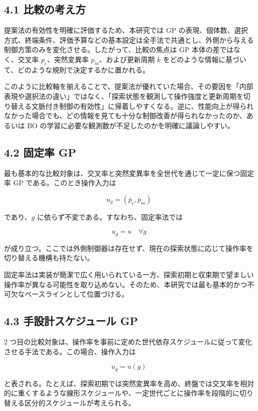 \subsection{4.1 比較の考え方}


提案法の有効性を明確に評価するため、本研究では GP の表現、個体数、選択方式、終端条件、評価予算などの基本設定は全手法で共通とし、外側から与える制御方策のみを変化させる。したがって、比較の焦点は GP 本体の差ではなく、交叉率 $p_c$、突然変異率 $p_m$、および更新周期 $k$ をどのような情報に基づいて、どのような規則で決定するかに置かれる。

このように比較軸を揃えることで、提案法が優れていた場合、その要因を「内部表現や選択法の違い」ではなく、「探索状態を観測して操作強度と更新周期を切り替える文脈付き制御の有効性」に帰着しやすくなる。逆に、性能向上が得られなかった場合でも、どの情報を見ても十分な制御改善が得られなかったのか、あるいは BO の学習に必要な観測数が不足したのかを明確に議論しやすい。

\subsection{4.2 固定率 GP}


最も基本的な比較対象は、交叉率と突然変異率を全世代を通じて一定に保つ固定率 GP である。このとき操作入力は

\[
u_g = (\bar{p}_c, \bar{p}_m)
\]

であり、$g$ に依らず不変である。すなわち、固定率法では

\[
u_g = u
\quad
\forall g
\]

が成り立つ。ここでは外側制御器は存在せず、現在の探索状態に応じて操作率を切り替える機構も持たない。

固定率法は実装が簡潔で広く用いられている一方、探索初期と収束期で望ましい操作率が異なる可能性を取り込めない。そのため、本研究では最も基本的かつ不可欠なベースラインとして位置づける。

\subsection{4.3 手設計スケジュール GP}


2 つ目の比較対象は、操作率を事前に定めた世代依存スケジュールに従って変化させる手法である。この場合、操作入力は

\[
u_g = u(g)
\]

と表される。たとえば、探索初期では突然変異率を高め、終盤では交叉率を相対的に重くするような線形スケジュールや、一定世代ごとに操作率を段階的に切り替える区分的スケジュールが考えられる。

